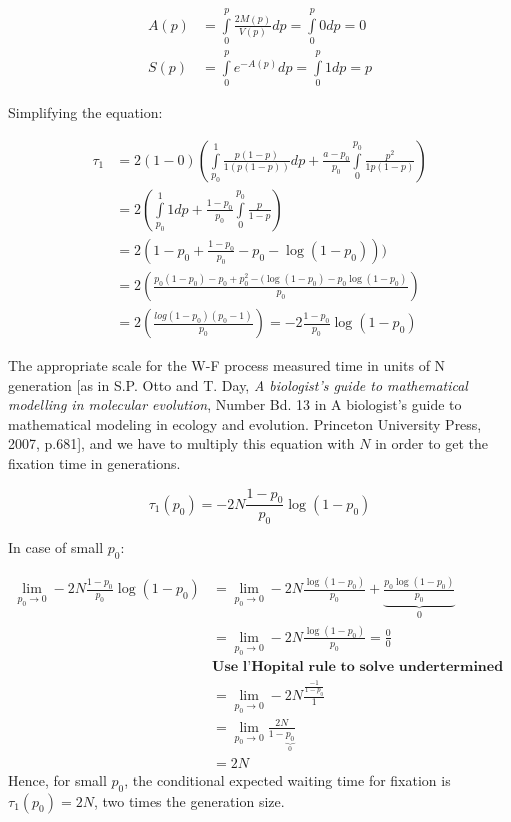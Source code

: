 \begin{align*}
A(p) &= \int\limits_{0}^{p} \frac{2M(p)}{V(p)} dp = \int\limits_{0}^{p} 0dp = 0 \\
S(p) &= \int\limits_{0}^{p} e^{-A(p)}dp = \int\limits_{0}^{p} 1dp = p
\end{align*}

Simplifying the equation:

\begin{align*}
\tau_1 &= 2(1-0) \left( \int\limits_{p_0}^{1} \frac{p(1-p)}{1(p(1-p))}dp +\frac{a-p_0}{p_0} \int\limits_{0}^{p_0} \frac{p^2}{1p(1-p)} \right)\\
&= 2 \left( \int\limits_{p_0}^{1}  1dp + \frac{1-p_0}{p_0} \int\limits_{0}^{p_0} \frac{p}{1-p}\right) \\
&= 2(1-p_0 + \frac{1-p_0}{p_0}-p_0-\log(1-p_0)))\\
&= 2(\frac{p_0(1-p_0)-p_0+p^2_0 - (\log(1-p_0) -p_0 \log(1-p_0)}{p_0})\\
&= 2(\frac{log(1-p_0)(p_0-1)}{p_0}) = -2\frac{1-p_0}{p_0} \log(1-p_0)
\end{align*}

The appropriate scale for the W-F process measured time in units of N generation [as in S.P. Otto and T. Day, \textit{A biologist's guide to mathematical modelling in molecular evolution}, Number Bd. 13 in A biologist’s guide to mathematical modeling in ecology and evolution. Princeton University Press, 2007, p.681], and we have to multiply this equation with $N$ in order to get the fixation time in generations.

\[ \tau_1(p_0) = -2N\frac{1-p_0}{p_0}\log(1-p_0) \]

In case of small $p_0$:

\begin{align*}
\lim\limits_{p_0 \rightarrow 0} -2N \frac{1-p_0}{p_0} \log(1-p_0) &= \lim\limits_{p_0 \rightarrow 0} -2N \frac{\log(1-p_0)}{p_0}+\underbrace{\frac{p_0\log(1-p_0)}{p_0}}_\text{$0$}\\
&= \lim\limits_{p_0 \rightarrow 0} -2N\frac{\log(1-p_0)}{p_0} = \frac{0}{0} \\
& \textbf{Use l'Hopital rule to solve undertermined forms}\\
&= \lim\limits_{p_0 \rightarrow 0} -2N\frac{\frac{-1}{1-p_0}}{1} \\
&= \lim\limits_{p_0 \rightarrow 0} \frac{2N}{1-\underbrace{p_0}_\text{$0$}}\\
&= 2N
\end{align*}
Hence, for small $p_0$, the conditional expected waiting time for fixation is $\tau_1(p_0) = 2N$, two times the generation size.

